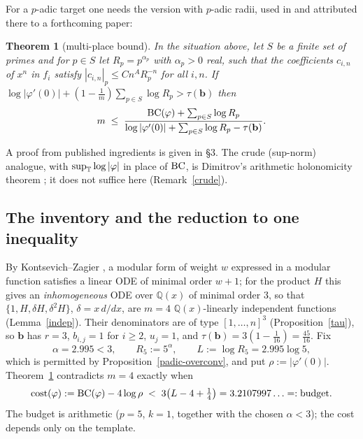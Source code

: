 \documentclass[11pt]{amsart}
\newtheorem{theorem}{Theorem}[section]
\theoremstyle{remark}
\newcommand{\Q}{\mathbb Q}\newcommand{\Z}{\mathbb Z}\newcommand{\R}{\mathbb R}\newcommand{\C}{\mathbb C}
\begin{document}
For a $p$-adic target one needs the version with $p$-adic radii, used in \cite[\S6.2]{CDTicm} and attributed there to a forthcoming paper:
\begin{theorem}[multi-place bound]\label{adelic}
In the situation above, let $S$ be a finite set of primes and for $p\in S$ let $R_p=p^{\alpha_p}$ with $\alpha_p>0$ real, such that the coefficients $c_{i,n}$ of $x^n$ in $f_i$ satisfy $|c_{i,n}|_p\le Cn^AR_p^{-n}$ for all $i,n$. If $\log|\varphi'(0)|+(1-\tfrac1m)\sum_{p\in S}\log R_p>\tau(\mathbf b)$ then
\[m\;\le\;\frac{\mathrm{BC}(\varphi)+\sum_{p\in S}\log R_p}{\log|\varphi'(0)|+\sum_{p\in S}\log R_p-\tau(\mathbf b)} .\]
\end{theorem}
A proof from published ingredients is given in \S3. The crude (sup-norm) analogue, with $\sup_{\mathbb T}\log|\varphi|$ in place of $\mathrm{BC}$, is Dimitrov's arithmetic holonomicity theorem \cite{Dim19,DimLNT}; it does not suffice here (Remark~\ref{crude}).

\subsection{The inventory and the reduction to one inequality}
By Kontsevich--Zagier \cite[\S2.3]{KZ}, a modular form of weight $w$ expressed in a modular function satisfies a linear ODE of minimal order $w+1$; for the product $H$ this gives an \emph{inhomogeneous} ODE over $\Q(x)$ of minimal order $3$, so that $\{1,H,\delta H,\delta^2H\}$, $\delta=x\,d/dx$, are $m=4$ $\Q(x)$-linearly independent functions (Lemma~\ref{indep}). Their denominators are of type $[1,\dots,n]^3$ (Proposition~\ref{tau}), so $\mathbf b$ has $r=3$, $b_{i,j}=1$ for $i\ge2$, $u_j=1$, and $\tau(\mathbf b)=3(1-\tfrac1{16})=\tfrac{45}{16}$. Fix
\[\alpha=2.995<3,\qquad R_5:=5^\alpha,\qquad L:=\log R_5=2.995\log5,\]
which is permitted by Proposition~\ref{padic-overconv}, and put $\rho:=|\varphi'(0)|$. Theorem~\ref{adelic} contradicts $m=4$ exactly when
\begin{equation}\label{ineq}
\mathrm{cost}(\varphi):=\mathrm{BC}(\varphi)-4\log\rho\;<\;3\bigl(L-4+\tfrac14\bigr)=3.2107997\ldots=: \mathrm{budget}.
\end{equation}
The budget is arithmetic ($p=5$, $k=1$, together with the chosen $\alpha<3$); the cost depends only on the template.
\end{document}
